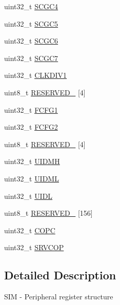 \begin{DoxyCompactItemize}
\item 
uint32\+\_\+t \hyperlink{struct_s_i_m___mem_map_a96c123ab70356a131990c9ae3812834e}{S\+C\+G\+C4}
\item 
uint32\+\_\+t \hyperlink{struct_s_i_m___mem_map_ae9d560d3862eb171c739acaf92daa8aa}{S\+C\+G\+C5}
\item 
uint32\+\_\+t \hyperlink{struct_s_i_m___mem_map_ad40dd833ac37056f5341b692039a5f10}{S\+C\+G\+C6}
\item 
uint32\+\_\+t \hyperlink{struct_s_i_m___mem_map_aa35362a8c756eedb82b8cf00f98c43da}{S\+C\+G\+C7}
\item 
uint32\+\_\+t \hyperlink{struct_s_i_m___mem_map_afa315c39ebd4ef380b7f8d67a88d4f82}{C\+L\+K\+D\+I\+V1}
\item 
uint8\+\_\+t \hyperlink{struct_s_i_m___mem_map_ad7e1d9ac03bc795d98c49ee8574bfedc}{R\+E\+S\+E\+R\+V\+E\+D\+\_} \mbox{[}4\mbox{]}
\item 
uint32\+\_\+t \hyperlink{struct_s_i_m___mem_map_a2b78edd16e6d046eb3399182216bf816}{F\+C\+F\+G1}
\item 
uint32\+\_\+t \hyperlink{struct_s_i_m___mem_map_afd105923b2815e01119a5bc195ceebd6}{F\+C\+F\+G2}
\item 
uint8\+\_\+t \hyperlink{struct_s_i_m___mem_map_a93af4e6410ab634b2377389fc500c73a}{R\+E\+S\+E\+R\+V\+E\+D\+\_} \mbox{[}4\mbox{]}
\item 
uint32\+\_\+t \hyperlink{struct_s_i_m___mem_map_af4fb6d5bc3fa71f9c905570d87a2e93f}{U\+I\+D\+MH}
\item 
uint32\+\_\+t \hyperlink{struct_s_i_m___mem_map_a51e871d8ac13db8b605b6ec1b3292be4}{U\+I\+D\+ML}
\item 
uint32\+\_\+t \hyperlink{struct_s_i_m___mem_map_ac23a694afa8d84e55fc43ff0c0ec1b29}{U\+I\+DL}
\item 
uint8\+\_\+t \hyperlink{struct_s_i_m___mem_map_aea5a0db6a5b82760418e4529895541da}{R\+E\+S\+E\+R\+V\+E\+D\+\_} \mbox{[}156\mbox{]}
\item 
uint32\+\_\+t \hyperlink{struct_s_i_m___mem_map_adb743819184b25914372606a57d6e416}{C\+O\+PC}
\item 
uint32\+\_\+t \hyperlink{struct_s_i_m___mem_map_aa6f9efca2d70bfed14630de650d77ba8}{S\+R\+V\+C\+OP}
\end{DoxyCompactItemize}


\subsection{Detailed Description}
S\+IM -\/ Peripheral register structure 

